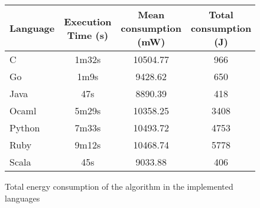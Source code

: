 \begin{figure}[H]
    \centering
    \begin{tabular}{|l|c|c|c|}
    \hline
    Language & Execution Time (s) & Mean consumption (mW) & Total consumption (J) \\
    \hline
    C & 1m32s & 10504.77 & 966\\
    Go & 1m9s & 9428.62 & 650\\
    Java & 47s & 8890.39 & 418\\
    Ocaml & 5m29s & 10358.25 & 3408\\
    Python & 7m33s & 10493.72 & 4753\\
    Ruby & 9m12s & 10468.74 & 5778\\
    Scala & 45s & 9033.88 & 406\\
    \hline
    \end{tabular}
    \caption{Total energy consumption of the algorithm in the implemented languages}
    \label{fig:tec}
    \end{figure}
    


